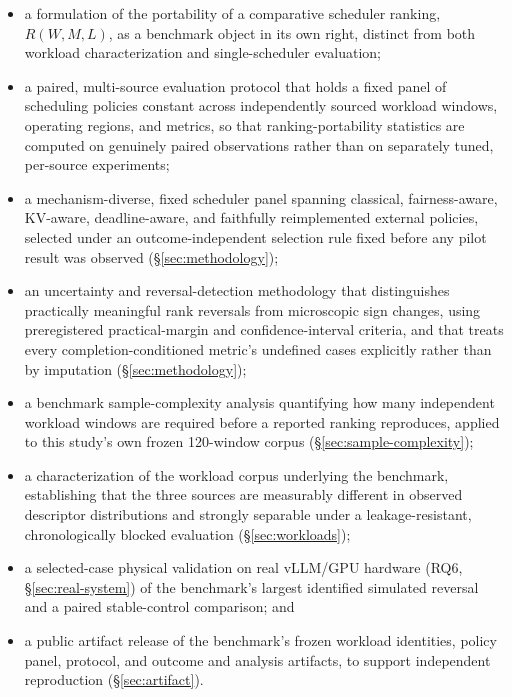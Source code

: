 \documentclass[sn-basic,Numbered,pdflatex]{sn-jnl}
\begin{document}
\begin{itemize}
  \item a formulation of the portability of a comparative scheduler
    ranking, $R(W, M, L)$, as a benchmark object in its own right, distinct
    from both workload characterization and single-scheduler evaluation;
  \item a paired, multi-source evaluation protocol that holds a fixed
    panel of scheduling policies constant across independently sourced
    workload windows, operating regions, and metrics, so that
    ranking-portability statistics are computed on genuinely paired
    observations rather than on separately tuned, per-source experiments;
  \item a mechanism-diverse, fixed scheduler panel spanning classical,
    fairness-aware, KV-aware, deadline-aware, and faithfully reimplemented
    external policies, selected under an outcome-independent selection
    rule fixed before any pilot result was observed
    (\S\ref{sec:methodology});
  \item an uncertainty and reversal-detection methodology that
    distinguishes practically meaningful rank reversals from microscopic
    sign changes, using preregistered practical-margin and
    confidence-interval criteria, and that treats every
    completion-conditioned metric's undefined cases explicitly rather than
    by imputation (\S\ref{sec:methodology});
  \item a benchmark sample-complexity analysis quantifying how many
    independent workload windows are required before a reported ranking
    reproduces, applied to this study's own frozen 120-window corpus
    (\S\ref{sec:sample-complexity});
  \item a characterization of the workload corpus underlying the
    benchmark, establishing that the three sources are measurably
    different in observed descriptor distributions and strongly separable
    under a leakage-resistant, chronologically blocked evaluation
    (\S\ref{sec:workloads});
  \item a selected-case physical validation on real vLLM/GPU hardware
    (RQ6, \S\ref{sec:real-system}) of the benchmark's largest identified
    simulated reversal and a paired stable-control comparison; and
  \item a public artifact release of the benchmark's frozen workload
    identities, policy panel, protocol, and outcome and analysis
    artifacts, to support independent reproduction (\S\ref{sec:artifact}).
\end{itemize}
\end{document}
